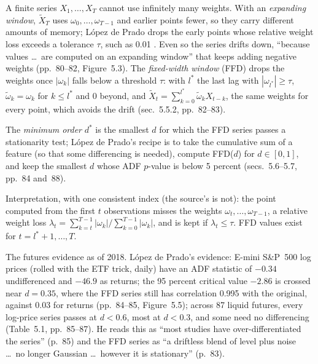 \begin{qfmethod}\label{meth:fixed-width-fractional-differencing}
 A finite series $X_1,\dots,X_T$ cannot use infinitely many weights. With an \emph{expanding window}, $\tilde X_T$ uses $\omega_0,\dots,\omega_{T-1}$ and earlier points fewer, so they carry different amounts of memory; López de Prado drops the early points whose relative weight loss exceeds a tolerance $\tau$, such as 0.01 \citep[chap.~5, sec.~5.5.1, p.~80]{alpha-afml}. Even so the series drifts down, ``because values \dots\ are computed on an expanding window'' that keeps adding negative weights (pp.~80--82, Figure~5.3). The \emph{fixed-width window} (FFD) drops the weights once $|\omega_k|$ falls below a threshold $\tau$: with $l^*$ the last lag with $|\omega_{l^*}|\ge\tau$, $\tilde\omega_k=\omega_k$ for $k\le l^*$ and $0$ beyond, and $\tilde X_t=\sum_{k=0}^{l^*}\tilde\omega_kX_{t-k}$, the same weights for every point, which avoids the drift (sec.~5.5.2, pp.~82--83).

The \emph{minimum order} $d^*$ is the smallest $d$ for which the FFD series passes a stationarity test; López de Prado's recipe is to take the cumulative sum of a feature (so that some differencing is needed), compute FFD($d$) for $d\in[0,1]$, and keep the smallest $d$ whose ADF $p$-value is below 5 percent (secs.~5.6--5.7, pp.~84 and~88).

 Interpretation, with one consistent index (the source's is not): the point computed from the first $t$ observations misses the weights $\omega_t,\dots,\omega_{T-1}$, a relative weight loss $\lambda_t=\sum_{k=t}^{T-1}|\omega_k|/\sum_{k=0}^{T-1}|\omega_k|$, and is kept if $\lambda_t\le\tau$. FFD values exist for $t=l^*+1,\dots,T$.

 The futures evidence as of 2018. López de Prado's evidence: E-mini S\&P~500 log prices (rolled with the ETF trick, daily) have an ADF statistic of $-0.34$ undifferenced and $-46.9$ as returns; the 95 percent critical value $-2.86$ is crossed near $d=0.35$, where the FFD series still has correlation 0.995 with the original, against 0.03 for returns (pp.~84--85, Figure~5.5); across 87 liquid futures, every log-price series passes at $d<0.6$, most at $d<0.3$, and some need no differencing (Table~5.1, pp.~85--87). He reads this as ``most studies have over-differentiated the series'' (p.~85) and the FFD series as ``a driftless blend of level plus noise \dots\ no longer Gaussian \dots\ however it is stationary'' (p.~83).


\end{qfmethod}
